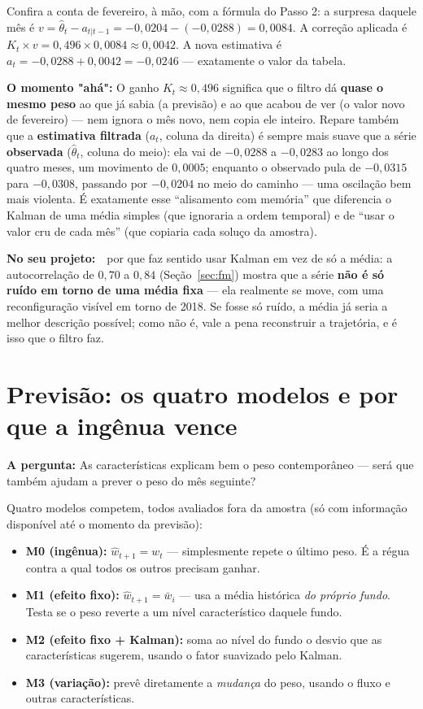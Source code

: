 \documentclass[11pt,a4paper]{article}
\newcommand{\pergunta}[1]{\par\vspace{4pt}\noindent\textbf{\color{azul}A pergunta:} #1\par\vspace{2pt}}
\newcommand{\aha}[1]{\par\vspace{4pt}\noindent\textbf{\color{vermelho}O momento "ahá":} #1\par\vspace{2pt}}
\newcommand{\noprojeto}[0]{\par\vspace{4pt}\noindent\textbf{No seu projeto:}\ }
\begin{document}
Confira a conta de fevereiro, à mão, com a fórmula do Passo 2: a surpresa daquele mês é $v =
\widehat\theta_t - a_{t|t-1} = -0{,}0204-(-0{,}0288) = 0{,}0084$. A correção aplicada é
$K_t\times v = 0{,}496 \times 0{,}0084 \approx 0{,}0042$. A nova estimativa é
$a_t = -0{,}0288 + 0{,}0042 = -0{,}0246$ --- exatamente o valor da tabela.

\aha{O ganho $K_t\approx0{,}496$ significa que o filtro dá \textbf{quase o mesmo peso} ao que já
sabia (a previsão) e ao que acabou de ver (o valor novo de fevereiro) --- nem ignora o mês novo,
nem copia ele inteiro. Repare também que a \textbf{estimativa filtrada} ($a_t$, coluna da
direita) é sempre mais suave que a série \textbf{observada} ($\widehat\theta_t$, coluna do meio):
ela vai de $-0{,}0288$ a $-0{,}0283$ ao longo dos quatro meses, um movimento de $0{,}0005$;
enquanto o observado pula de $-0{,}0315$ para $-0{,}0308$, passando por $-0{,}0204$ no meio do
caminho --- uma oscilação bem mais violenta. É exatamente esse ``alisamento com memória'' que
diferencia o Kalman de uma média simples (que ignoraria a ordem temporal) e de ``usar o valor
cru de cada mês'' (que copiaria cada soluço da amostra).}

\noprojeto\ por que faz sentido usar Kalman em vez de só a média: a autocorrelação de $0{,}70$ a
$0{,}84$ (Seção~\ref{sec:fm}) mostra que a série \textbf{não é só ruído em torno de uma média
fixa} --- ela realmente se move, com uma reconfiguração visível em torno de 2018. Se fosse só
ruído, a média já seria a melhor descrição possível; como não é, vale a pena reconstruir a
trajetória, e é isso que o filtro faz.

\section{Previsão: os quatro modelos e por que a ingênua vence}
\label{sec:previsao}

\pergunta{As características explicam bem o peso contemporâneo --- será que também ajudam a
prever o peso do mês seguinte?}

Quatro modelos competem, todos avaliados fora da amostra (só com informação disponível até o
momento da previsão):

\begin{itemize}[topsep=2pt,itemsep=3pt]
\item \textbf{M0 (ingênua):} $\widehat w_{t+1} = w_t$ --- simplesmente repete o último peso. É a
régua contra a qual todos os outros precisam ganhar.
\item \textbf{M1 (efeito fixo):} $\widehat w_{t+1} = \bar w_i$ --- usa a média histórica \emph{do
próprio fundo}. Testa se o peso reverte a um nível característico daquele fundo.
\item \textbf{M2 (efeito fixo + Kalman):} soma ao nível do fundo o desvio que as características
sugerem, usando o fator suavizado pelo Kalman.
\item \textbf{M3 (variação):} prevê diretamente a \emph{mudança} do peso, usando o fluxo e outras
características.
\end{itemize}
\end{document}
